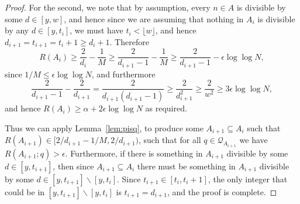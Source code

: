 \begin{proof}
For the second, we note that by assumption, every $n\in A$ is divisible by some $d\in [y,w]$, and hence since we are assuming that nothing in $A_i$ is divisible by any $d\in [y,t_i]$, we must have $t_i<\lfloor w\rfloor$, and hence $d_{i+1}=t_{i+1}=t_i+1\geq d_i+1$. Therefore
\[R(A_i)\geq \frac{2}{d_i}-\frac{1}{M}\geq \frac{2}{d_{i+1}-1}-\frac{1}{M}\geq \frac{2}{d_{i+1}-1}-\epsilon\log\log N,\]
since $1/M \leq \epsilon\log\log N$, and furthermore
\[\frac{2}{d_{i+1}-1}-\frac{2}{d_{i+1}}=\frac{2}{d_{i+1}(d_{i+1}-1)}\geq \frac{2}{d_{i+1}^2}\geq \frac{2}{w^2}\geq 3\epsilon\log\log N,\]
and hence $R(A_i)\geq \alpha+2\epsilon\log\log N$ as required.

Thus we can apply Lemma~\ref{lem:pisq}, to produce some $A_{i+1}\subseteq A_i$ such that $R(A_{i+1})\in [2/d_{i+1}-1/M,2/d_{i+1})$, such that for all $q\in \mathcal{Q}_{A_{i+1}}$ we have $R(A_{i+1};q)>\epsilon$. Furthermore, if there is something in $A_{i+1}$ divisible by some $d\in [y,t_{i+1}]$, then since $A_{i+1}\subseteq A_i$ there must be something in $A_{i+1}$ divisible by some $d\in [y,t_{i+1}]\backslash [y,t_i]$. Since $t_{i+1}\in [t_i,t_i+1]$, the only integer that could be in $[y,t_{i+1}]\backslash [y,t_i]$ is $t_{i+1}=d_{i+1}$, and the proof is complete. 
\end{proof}

